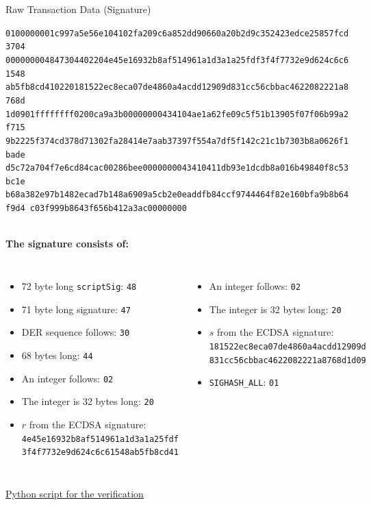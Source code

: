 \documentclass[]{beamer}
\begin{document}
\begin{frame}{Raw Transaction Data (Signature)}
	\begin{scriptsize}
\texttt{\textcolor{black!30}{0100000001c997a5e56e104102fa209c6a852dd90660a20b2d9c352423edce25857fcd3704
00000000}{\alert<2>{48}\alert<3>{47}\alert<4>{30}\alert<5>{44}\alert<6>{02}\alert<7>{20}\alert<8>{4e45e16932b8af514961a1d3a1a25fdf3f4f7732e9d624c6c61548
ab5fb8cd41}\alert<9>{02}\alert<10>{20}\alert<11>{181522ec8eca07de4860a4acdd12909d831cc56cbbac4622082221a8768d
1d09}\alert<12>{01}}\textcolor{black!30}{ffffffff0200ca9a3b00000000434104ae1a62fe09c5f51b13905f07f06b99a2f715
9b2225f374cd378d71302fa28414e7aab37397f554a7df5f142c21c1b7303b8a0626f1bade
d5c72a704f7e6cd84cac00286bee0000000043410411db93e1dcdb8a016b49840f8c53bc1e
b68a382e97b1482ecad7b148a6909a5cb2e0eaddfb84ccf9744464f82e160bfa9b8b64f9d4
c03f999b8643f656b412a3ac00000000}}
\end{scriptsize}
\vspace{1em}
\scriptsize \\
\textbf{The signature consists of:}\\
\begin{columns}[T]
\begin{itemize}
	\item \alert<2>{72 byte long \texttt{scriptSig}: \texttt{48}}
	\item \alert<3>{71 byte long signature: \texttt{47}}
	\item \alert<4>{DER sequence follows: \texttt{30}}
	\item \alert<5>{68 bytes long: \texttt{44}}
	\item \alert<6>{An integer follows: \texttt{02}}
	\item \alert<7>{The integer is 32 bytes long: \texttt{20}}
	\item \alert<8>{$r$ from the ECDSA signature: 	\texttt{4e45e16932b8af514961a1d3a1a25fdf\\3f4f7732e9d624c6c61548ab5fb8cd41}}
\end{itemize}
\begin{itemize}
	\item \alert<9>{An integer follows: \texttt{02}}
	\item \alert<10>{The integer is 32 bytes long: \texttt{20}}
	\item \alert<11>{$s$ from the ECDSA signature: \texttt{181522ec8eca07de4860a4acdd12909d\\831cc56cbbac4622082221a8768d1d09}}
	\item \alert<12>{\texttt{SIGHASH\_ALL}: \texttt{01}}
\end{itemize}
\end{columns}
\vspace{1.5em}
\href{https://github.com/cifunibas/Bitcoin-Blockchain-Cryptoassets/blob/main/assets/scripts/satoshi_transaction.py}{\link Python script for the verification}
\end{frame}
\end{document}
